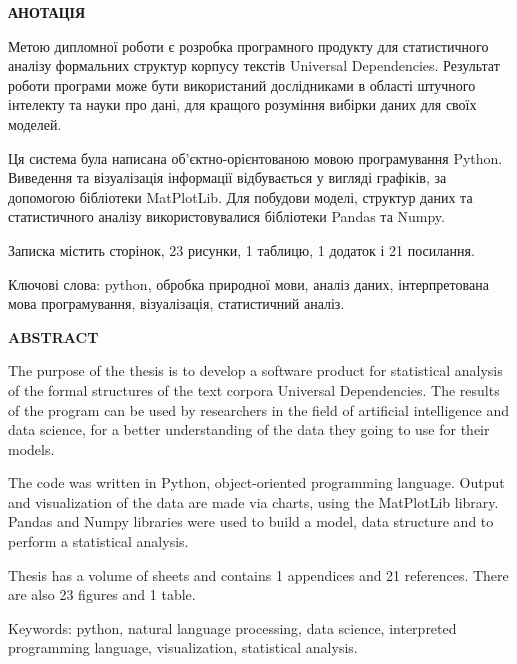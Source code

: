 \thispagestyle{empty}
\begin{center}
\textbf{\Large АНОТАЦІЯ}
\end{center}

Метою дипломної роботи є розробка програмного продукту для статистичного
аналізу формальних структур корпусу текстів Universal Dependencies.
Результат роботи програми може бути використаний дослідниками в області
штучного інтелекту та науки про дані, для кращого розуміння вибірки даних
для своїх моделей. 

Ця система була написана об’єктно-орієнтованою мовою програмування Python.
Виведення та візуалізація інформації відбувається у вигляді графіків, за
допомогою бібліотеки MatPlotLib. Для побудови моделі, структур даних
та статистичного аналізу використовувалися бібліотеки Pandas та Numpy.

Записка містить \pageref{LastPage} сторінок, 23 рисунки, 1 таблицю, 1 додаток і 21 посилання.

Ключові слова: python, обробка природної мови, аналіз даних, інтерпретована мова програмування, візуалізація, статистичний аналіз.

\newpage
\thispagestyle{empty}

\begin{center}
\textbf{\Large ABSTRACT}
\end{center}

The purpose of the thesis is to develop a software product for statistical
analysis of the formal structures of the text corpora Universal Dependencies.
The results of the program can be used by researchers in the field of
artificial intelligence and data science, for a better understanding of the data they going to use for their models.

The code was written in Python, object-oriented programming language.
Output and visualization of the data are made via charts, using the MatPlotLib library. Pandas and Numpy libraries were used to build a model, data structure
and to perform a statistical analysis.

Thesis has a volume of \pageref{LastPage} sheets and contains 1 appendices and 21 references. There are also 23 figures and 1 table.

Keywords: python, natural language processing, data science, interpreted programming language, visualization, statistical analysis.